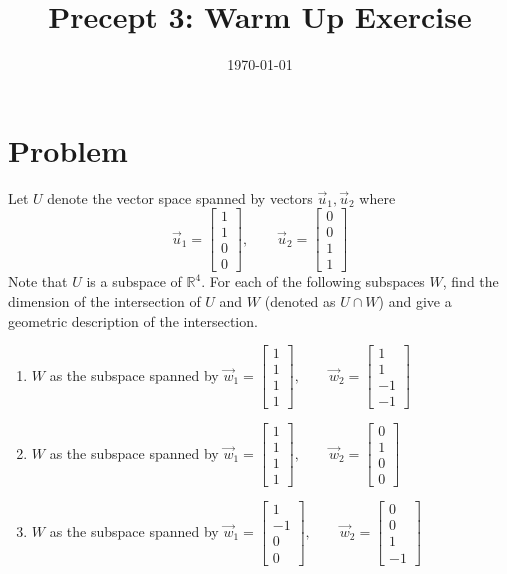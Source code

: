 \documentclass[11pt]{article}
\title{Precept 3: Warm Up Exercise}
\date{\today}
\begin{document}
\maketitle
\thispagestyle{fancy}

\section*{Problem}
Let $U$ denote the vector space spanned by vectors $\vec{u}_1,\vec{u}_2$ where
\[
\vec{u}_1=\begin{bmatrix}
    1\\1\\0\\0
\end{bmatrix},\qquad \vec{u}_2=\begin{bmatrix}
    0\\0\\1\\1
\end{bmatrix}
\]
Note that $U$ is a subspace of $\mathbb{R}^4$. For each of the following subspaces $W$, find the dimension of the intersection of $U$ and $W$ (denoted as $U\cap W$) and give a geometric description of the intersection.
\begin{enumerate}
    \item $W$ as the subspace spanned by $\vec{w}_1=\begin{bmatrix}
    1\\1\\1\\1
\end{bmatrix},\qquad \vec{w}_2=\begin{bmatrix}
    1\\1\\-1\\-1
\end{bmatrix}$
    \item $W$ as the subspace spanned by $\vec{w}_1=\begin{bmatrix}
    1\\1\\1\\1
\end{bmatrix},\qquad \vec{w}_2=\begin{bmatrix}
    0\\1\\0\\0
\end{bmatrix}$
    \item $W$ as the subspace spanned by $\vec{w}_1=\begin{bmatrix}
    1\\-1\\0\\0
\end{bmatrix},\qquad \vec{w}_2=\begin{bmatrix}
    0\\0\\1\\-1
\end{bmatrix}$
\end{enumerate}
\end{document}
